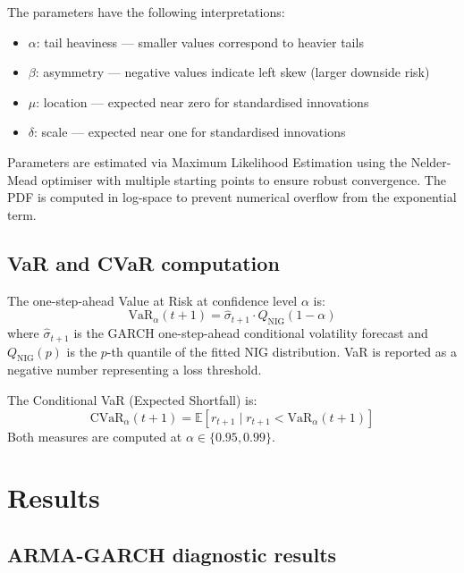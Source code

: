 \documentclass[12pt, a4paper]{article}
\begin{document}
The parameters have the following interpretations:
\begin{itemize}
  \item $\alpha$: tail heaviness --- smaller values correspond to 
        heavier tails
  \item $\beta$: asymmetry --- negative values indicate left skew 
        (larger downside risk)
  \item $\mu$: location --- expected near zero for standardised 
        innovations
  \item $\delta$: scale --- expected near one for standardised 
        innovations
\end{itemize}

Parameters are estimated via Maximum Likelihood Estimation using the 
Nelder-Mead optimiser with multiple starting points to ensure robust 
convergence. The PDF is computed in log-space to prevent numerical 
overflow from the exponential term.

\subsection{VaR and CVaR computation}

The one-step-ahead Value at Risk at confidence level $\alpha$ is:
\begin{equation}
  \text{VaR}_\alpha(t+1) = \hat{\sigma}_{t+1} \cdot 
  Q_{\text{NIG}}(1 - \alpha)
\end{equation}
where $\hat{\sigma}_{t+1}$ is the GARCH one-step-ahead conditional 
volatility forecast and $Q_{\text{NIG}}(p)$ is the $p$-th quantile 
of the fitted NIG distribution. VaR is reported as a negative 
number representing a loss threshold.

The Conditional VaR (Expected Shortfall) is:
\begin{equation}
  \text{CVaR}_\alpha(t+1) = 
  \mathbb{E}\!\left[r_{t+1} \mid r_{t+1} < 
  \text{VaR}_\alpha(t+1)\right]
\end{equation}
Both measures are computed at $\alpha \in \{0.95, 0.99\}$.

\section{Results}

\subsection{ARMA-GARCH diagnostic results}
\end{document}
